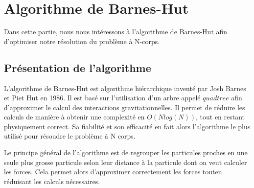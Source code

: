 \chapter{Algorithme de Barnes-Hut}

Dans cette partie, nous nous intéressons à l'algorithme de Barnes-Hut afin d'optimiser notre résolution du problème à N-corps.

\section{Présentation de l'algorithme}

L'algorithme de Barnes-Hut est algorithme hiérarchique inventé par Josh Barnes et Piet Hut en 1986. Il est basé sur l'utilisation d'un arbre appelé $quadtree$ afin d'approximer le calcul des  interactions gravitationnelles. Il permet de réduire les calculs de manière à obtenir une complexité en $O(Nlog(N))$, tout en restant physiquement correct. Sa fiabilité et son efficacité en fait alors l'algorithme le plus utilisé pour résoudre le problème à N corps.
 

Le principe général de l'algorithme est de regrouper les particules proches en une seule plus grosse particule selon leur distance  à la particule dont on veut calculer les forces. Cela permet alors d'approximer correctement les forces touten réduisant les calculs nécessaires.


